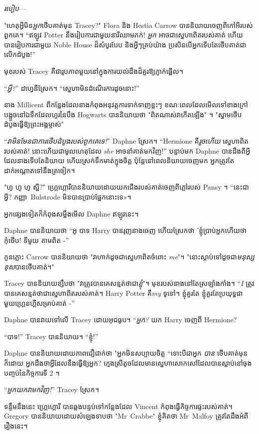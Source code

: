 {\emph{របៀប—}

"ហេតុអ្វីមិន\emph{អ្នក}ថើបគាត់មុន Tracey?" Flora និង Hestia Carrow បាននិយាយចេញពីកៅអីរបស់ពួកគេ។ “ឥឡូវ Potter នឹងរៀបការជាមួយនារីឈាមភក់! \emph{អ្នក} អាចជាស្នេហាពិតរបស់គាត់ ហើយបានរៀបការជាមួយ Noble House ដ៏សំបូរបែប និងអ្វីៗគ្រប់យ៉ាង ប្រសិនបើអ្នកទើបតែថើបគាត់ជាលើកដំបូង!”

មុខរបស់ Tracey គឺជារូបភាពមួយនៅក្នុងការយល់ដឹងដ៏គួរឱ្យភ្ញាក់ផ្អើល។

“\emph{អ្វី?}” ដាហ្វនីស្រែក។ “ស្នេហាមិនដំណើរការដូចនោះ!”

នាង Millicent ពីកន្លែងដែលនាងកំពុងអនុវត្តការទាក់ទាញខ្លះៗ ខណៈពេលដែលមើលទៅខាងក្រៅបង្អួចនៅឯទឹកដែលហូរនៃបឹង Hogwarts បាននិយាយថា "ពិតណាស់វាកើតឡើង" ។ "ស្នាមថើបដំបូងធ្វើឱ្យព្រះអង្គម្ចាស់"

“\emph{វាមិនមែនជាការថើបដំបូងរបស់ពួកគេទេ!}” Daphne ស្រែក។ “Hermione គឺ\emph{រួចហើយ} ស្នេហាពិតរបស់គាត់! នោះហើយជាមូលហេតុដែល \emph{she} អាចនាំគាត់មកវិញ!” បន្ទាប់មក Daphne បានដឹងពីអ្វីដែលនាងទើបតែនិយាយ ហើយស្រក់ទឹកមាត់ក្នុងចិត្ត ប៉ុន្តែនៅពេលនិយាយចេញមក អ្នកត្រូវតែដាក់អណ្តាតទៅនឹងត្រចៀក។

"ហូ ហូ ហូ ស្អី?" ហ្គ្រេហ្គោរីបាននិយាយដោយយកជើងរបស់គាត់ចេញពីភ្លៅរបស់ Pansy ។ “នេះជាអ្វី? កញ្ញា~Bulstrode មិន​បាន​ប្រាប់​ផ្នែក​នោះ​ទេ»។

អ្នកផ្សេងទៀតក៏កំពុងសម្លឹងមើល Daphne ឥឡូវនេះ។

Daphne បាននិយាយថា “អូ បាទ Harry បានរុញនាងចេញ ហើយស្រែកថា 'ខ្ញុំប្រាប់អ្នកហើយថាកុំថើប! ទីមួយ តាមពិត -”

កូនភ្លោះ Carrow បាននិយាយថា "វាហាក់ដូចជាស្នេហាពិតចំពោះ \emph{me}"។ "នោះស្តាប់ទៅដូចជា\emph{មនុស្សខុស}បានថើបគាត់។"

Tracey បាននិយាយខ្សឹបថា "វាត្រូវបានគេសន្មត់ថាជា\emph{ខ្ញុំ}"។ មុខរបស់នាងនៅតែស្រឡាំងកាំង។ “\emph{I} ត្រូវបានគេសន្មត់ថាជាស្នេហាពិតរបស់គាត់។ Harry Potter គឺ\emph{my} ទូទៅ។ ខ្ញុំគួរតែ ខ្ញុំគួរតែប្រយុទ្ធជាមួយហ្គ្រេនហ្គឺសម្រាប់គាត់ -”

Daphne បាន​វាយ​ទៅលើ Tracey ដោយ​អុជធូប។ “\emph{អ្នក?} យក Harry ចេញពី Hermione?

“បាទ!” Tracey បាននិយាយ។ “ខ្ញុំ!”

Daphne បាននិយាយដោយភាពជឿជាក់ថា "អ្នកមិនសប្បាយចិត្ត “ទោះបីជាអ្នក \emph{បាន} ថើបគាត់មុនក៏ដោយ អ្នកដឹងថាអ្វីដែលនឹងធ្វើឱ្យអ្នក? ក្មេងស្រីតូចដែលមានស្នេហាសោកសៅដែលបានស្លាប់នៅចុងបញ្ចប់នៃកិច្ចការទី 2 ។

“\emph{អ្នកយកវាមកវិញ!}” Tracey ស្រែក។

ទន្ទឹមនឹងនេះ ហ្គ្រេហ្គោរី បានឆ្លងបន្ទប់ទៅកន្លែងដែល Vincent កំពុងធ្វើកិច្ចការផ្ទះរបស់គាត់។ Gregory បាននិយាយដោយសំឡេងទាបថា "Mr~Crabbe" ខ្ញុំគិតថា Mr~Malfoy ត្រូវតែដឹងអំពីរឿងនេះ។

}
